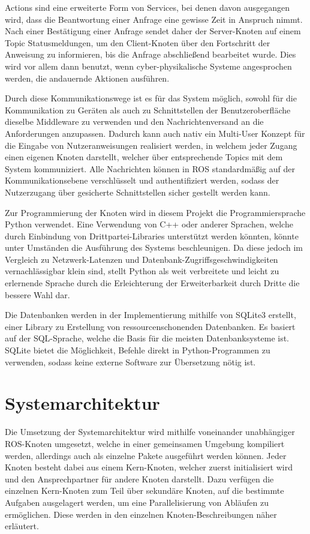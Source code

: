 Actions sind eine erweiterte Form von Services, bei denen davon ausgegangen wird, dass die Beantwortung einer Anfrage eine gewisse Zeit in Anspruch nimmt. Nach einer Bestätigung einer Anfrage sendet daher der Server-Knoten auf einem Topic Statusmeldungen, um den Client-Knoten über den Fortschritt der Anweisung zu informieren, bis die Anfrage abschließend bearbeitet wurde. Dies wird vor allem dann benutzt, wenn cyber-physikalische Systeme angesprochen werden, die andauernde Aktionen ausführen. 

Durch diese Kommunikationswege ist es für das System möglich, sowohl für die Kommunikation zu Geräten als auch zu Schnittstellen der Benutzeroberfläche dieselbe Middleware zu verwenden und den Nachrichtenversand an die Anforderungen anzupassen. Dadurch kann auch nativ ein Multi-User Konzept für die Eingabe von Nutzeranweisungen realisiert werden, in welchem jeder Zugang einen eigenen Knoten darstellt, welcher über entsprechende Topics mit dem System kommuniziert. Alle Nachrichten können in ROS standardmäßig auf der Kommunikationsebene verschlüsselt und authentifiziert werden, sodass der Nutzerzugang über gesicherte Schnittstellen sicher gestellt werden kann.

Zur Programmierung der Knoten wird in diesem Projekt die Programmiersprache Python verwendet. Eine Verwendung von C++ oder anderer Sprachen, welche durch Einbindung von Drittpartei-Libraries unterstützt werden könnten, könnte unter Umständen die Ausführung des Systems beschleunigen. Da diese jedoch im Vergleich zu Netzwerk-Latenzen und Datenbank-Zugriffsgeschwindigkeiten vernachlässigbar klein sind, stellt Python als weit verbreitete und leicht zu erlernende Sprache durch die Erleichterung der Erweiterbarkeit durch Dritte die bessere Wahl dar.

Die Datenbanken werden in der Implementierung mithilfe von SQLite3 erstellt, einer Library zu Erstellung von ressourcenschonenden Datenbanken. Es basiert auf der SQL-Sprache, welche die Basis für die meisten Datenbanksysteme ist. SQLite bietet die Möglichkeit, Befehle direkt in Python-Programmen zu verwenden, sodass keine externe Software zur Übersetzung nötig ist.


\FloatBarrier
\section{Systemarchitektur}

Die Umsetzung der Systemarchitektur wird mithilfe voneinander unabhängiger ROS-Knoten umgesetzt, welche in einer gemeinsamen Umgebung kompiliert werden, allerdings auch als einzelne Pakete ausgeführt werden können. Jeder Knoten besteht dabei aus einem Kern-Knoten, welcher zuerst initialisiert wird und den Ansprechpartner für andere Knoten darstellt. Dazu verfügen die einzelnen Kern-Knoten zum Teil über sekundäre Knoten, auf die bestimmte Aufgaben ausgelagert werden, um eine Parallelisierung von Abläufen zu ermöglichen. Diese werden in den einzelnen Knoten-Beschreibungen näher erläutert.

